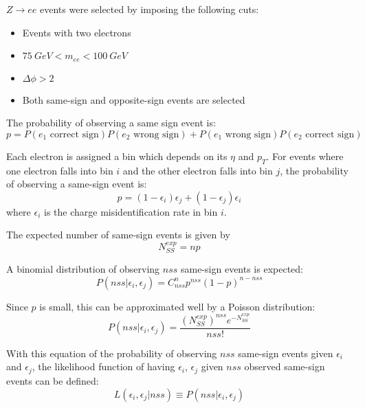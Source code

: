 $Z\rightarrow ee$ events were selected by imposing the following cuts:
\begin{itemize}
\item Events with two electrons
\item $75\ GeV < m_{ee} < 100\ GeV$
\item $\Delta \phi > 2$
\item Both same-sign and opposite-sign events are selected
\end{itemize}

The probability of observing a same sign event is:
\begin{equation}
p = P(e_1 \text{ correct sign})P(e_2 \text{ wrong sign}) + P(e_1 \text{ wrong sign})P(e_2 \text{ correct sign})
\end{equation}

Each electron is assigned a bin which depends on its $\eta$ and $p_T$. For events where one electron falls into bin $i$ and the other electron falls into bin $j$, the probability of observing a same-sign event is: 
\begin{equation}
p =(1-\epsilon_i)\epsilon_j + (1-\epsilon_j)\epsilon_i
\end{equation}
where $\epsilon_i$ is the charge misidentification rate in bin $i$.

The expected number of same-sign events is given by
\begin{equation}
N^{exp}_{SS} = np 
\end{equation}

A binomial distribution of observing $nss$ same-sign events is expected:
\begin{equation}
P(nss |\epsilon_i, \epsilon_j) =  C^n_{nss} p^{nss}(1-p)^{n-nss}
\end{equation}

Since $p$ is small, this can be approximated well by a Poisson distribution: 
\begin{equation}
P(nss |\epsilon_i, \epsilon_j) = \frac{(N^{exp}_{SS})^{nss} e^{-N^{exp}_{SS}}}{nss!}
\end{equation}

With this equation of the probability of observing $nss$ same-sign events given $\epsilon_i$ and $\epsilon_j$, the likelihood function of having $\epsilon_i$, $\epsilon_j$ given $nss$ observed same-sign events can be defined: 
\begin{equation}
L(\epsilon_i, \epsilon_j | nss) \equiv P(nss |\epsilon_i, \epsilon_j)
\end{equation}

